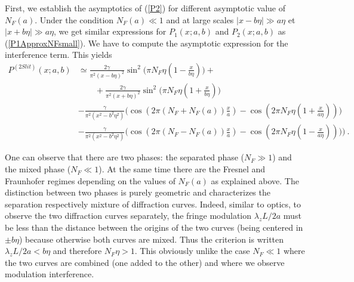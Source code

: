 \documentclass[12pt,aps,prb,preprint]{revtex4-1}   %
\begin{document}
First, we establish the asymptotics of (\ref{P2}) for different
asymptotic value of $N_F(a)$. Under the condition $N_F(a)\ll 1$
and at large scales $|x-b\eta|\gg a\eta$ et $|x+b\eta|\gg
a\eta$, we get  similar expressions for $P_1(x;a,b)$ and
$P_2(x;a,b)$ as (\ref{P1ApproxNFsmall}). We have to compute the
asymptotic expression for the interference term. This yields
\begin{align}\label{P2slApprox}
P^{(2 Slit)}(x;a,b)&\simeq\frac{2\gamma}{\pi^2 (x-b\eta)^2}
\sin^2{\bigl(\pi N_F\eta(1-\frac{x}{b\eta})\bigr)}
+\nonumber\\ & \qquad + \frac{2\gamma}{\pi^2 (x+b\eta)^2} \sin^2{\bigl(\pi
N_F\eta(1+\frac{x}{b\eta})\bigr)}
{}\nonumber\\{}&-\frac{\gamma}{\pi^2 (x^2-b^2\eta^2)}
\bigl(\cos{(2\pi (N_F+N_F(a))\frac{x}{a})}- \cos{(2\pi
N_F\eta(1+\frac{x}{a\eta}))}\bigr)
{}\nonumber\\{}&-\frac{\gamma}{\pi^2 (x^2-b^2\eta^2)}
\bigl(\cos{(2\pi (N_F-N_F(a))\frac{x}{a})}-\cos{(2\pi
N_F\eta(1-\frac{x}{a\eta}))}) \bigr)\ .
\end{align}


One can observe that there are two phases: the
separated phase ($N_F\gg 1$) and the mixed phase ($N_F\ll 1$). At
the same time there are the Fresnel and Fraunhofer regimes
depending on the values of $N_F(a)$ as explained above. The
distinction between two phases is purely geometric and
characterizes the separation respectively mixture of diffraction
curves. Indeed, similar to optics, to observe the two diffraction
curves separately, the fringe modulation $\lambda_z L/2a$ must be
less than the distance between the origins of the two curves
(being centered in $\pm b\eta$) because otherwise both curves are
mixed. Thus the criterion is written $ \lambda_z L/2a < b\eta $
and therefore $N_F\eta > 1$. This obviously unlike the case $ N_F
\ll 1 $ where the two curves are combined (one added to the other)
and where we observe modulation interference. %
\end{document}
